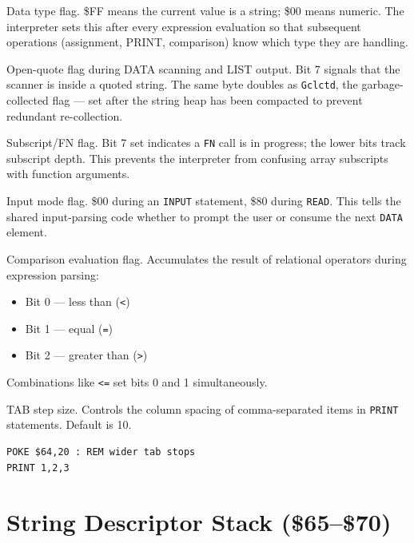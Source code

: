 
Data type flag.  \$FF means the current value is a string; \$00 means numeric.
The interpreter sets this after every expression evaluation so that subsequent
operations (assignment, PRINT, comparison) know which type they are handling.


Open-quote flag during DATA scanning and LIST output.  Bit 7 signals that the
scanner is inside a quoted string.  The same byte doubles as \texttt{Gclctd},
the garbage-collected flag --- set after the string heap has been compacted to
prevent redundant re-collection.


Subscript/FN flag.  Bit 7 set indicates a \texttt{FN} call is in progress;
the lower bits track subscript depth.  This prevents the interpreter from
confusing array subscripts with function arguments.


Input mode flag.  \$00 during an \texttt{INPUT} statement, \$80 during
\texttt{READ}.  This tells the shared input-parsing code whether to prompt the
user or consume the next \texttt{DATA} element.


Comparison evaluation flag.  Accumulates the result of relational operators
during expression parsing:
\begin{itemize}
  \item Bit 0 --- less than (\texttt{<})
  \item Bit 1 --- equal (\texttt{=})
  \item Bit 2 --- greater than (\texttt{>})
\end{itemize}
Combinations like \texttt{<=} set bits 0 and 1 simultaneously.


TAB step size.  Controls the column spacing of comma-separated items in
\texttt{PRINT} statements.  Default is 10.

\begin{lstlisting}
POKE $64,20 : REM wider tab stops
PRINT 1,2,3
\end{lstlisting}

\section{String Descriptor Stack (\$65--\$70)}

